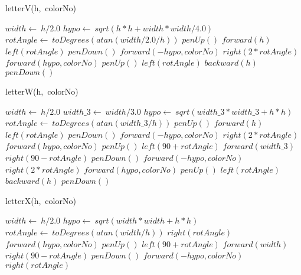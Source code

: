 \documentclass[a4paper,10pt]{article}
\begin{document}
\begin{algorithm}
\caption{letterV(h,\ colorNo)}
\begin{algorithmic}[5]

\STATE {}
\STATE {}
  \STATE \(width\gets\ h/2.0\)
  \STATE \(hypo\gets\ sqrt(h*h+width*width/4.0)\)
  \STATE \(rotAngle\gets\ toDegrees(atan(width/2.0/h))\)
  \STATE \(penUp()\)
  \STATE \(forward(h)\)
  \STATE \(left(rotAngle)\)
  \STATE \(penDown()\)
  \STATE \(forward(-hypo,colorNo)\)
  \STATE \(right(2*rotAngle)\)
  \STATE \(forward(hypo,colorNo)\)
  \STATE \(penUp()\)
  \STATE \(left(rotAngle)\)
  \STATE \(backward(h)\)
  \STATE \(penDown()\)

\end{algorithmic}
\end{algorithm}


\begin{algorithm}
\caption{letterW(h,\ colorNo)}
\begin{algorithmic}[5]

\STATE {}
\STATE {}
  \STATE \(width\gets\ h/2.0\)
  \STATE \(width\_3\gets\ width/3.0\)
  \STATE \(hypo\gets\ sqrt(width\_3*width\_3+h*h)\)
  \STATE \(rotAngle\gets\ toDegrees(atan(width\_3/h))\)
  \STATE \(penUp()\)
  \STATE \(forward(h)\)
  \STATE \(left(rotAngle)\)
  \STATE \(penDown()\)
  \STATE \(forward(-hypo,colorNo)\)
  \STATE \(right(2*rotAngle)\)
  \STATE \(forward(hypo,colorNo)\)
  \STATE \(penUp()\)
  \STATE \(left(90+rotAngle)\)
  \STATE \(forward(width\_3)\)
  \STATE \(right(90-rotAngle)\)
  \STATE \(penDown()\)
  \STATE \(forward(-hypo,colorNo)\)
  \STATE \(right(2*rotAngle)\)
  \STATE \(forward(hypo,colorNo)\)
  \STATE \(penUp()\)
  \STATE \(left(rotAngle)\)
  \STATE \(backward(h)\)
  \STATE \(penDown()\)

\end{algorithmic}
\end{algorithm}


\begin{algorithm}
\caption{letterX(h,\ colorNo)}
\begin{algorithmic}[5]

\STATE {}
\STATE {}
  \STATE \(width\gets\ h/2.0\)
  \STATE \(hypo\gets\ sqrt(width*width+h*h)\)
  \STATE \(rotAngle\gets\ toDegrees(atan(width/h))\)
  \STATE \(right(rotAngle)\)
  \STATE \(forward(hypo,colorNo)\)
  \STATE \(penUp()\)
  \STATE \(left(90+rotAngle)\)
  \STATE \(forward(width)\)
  \STATE \(right(90-rotAngle)\)
  \STATE \(penDown()\)
  \STATE \(forward(-hypo,colorNo)\)
  \STATE \(right(rotAngle)\)

\end{algorithmic}
\end{algorithm}
\end{document}
